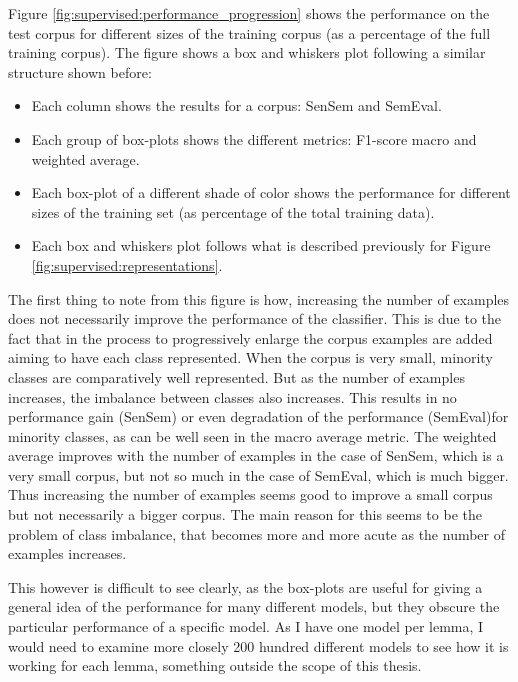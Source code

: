 Figure \ref{fig:supervised:performance_progression} shows the performance on
the test corpus for different sizes of the training corpus (as a percentage of
the full training corpus). The figure shows a box and whiskers plot following 
a similar structure shown before:

\begin{itemize}
  \item Each column shows the results for a corpus: SenSem and SemEval.
  \item Each group of box-plots shows the different metrics: F1-score macro
    and weighted average.
  \item Each box-plot of a different shade of color shows the performance for
    different sizes of the training set (as percentage of the total training
    data).
  \item Each box and whiskers plot follows what is described previously for
    Figure \ref{fig:supervised:representations}.
\end{itemize}

The first thing to note from this figure is how, increasing the number of
examples does not necessarily improve the performance of the classifier. This
is due to the fact that in the process to progressively enlarge the corpus
examples are added aiming to have each class represented. When the corpus is
very small, minority classes are comparatively well represented. But as the
number of examples increases, the imbalance between classes also increases.
This results in no performance gain (SenSem) or even degradation of the
performance (SemEval)for minority classes, as can be well seen in the macro
average metric. The weighted average improves with the number of examples in
the case of SenSem, which is a very small corpus, but not so much in the case
of SemEval, which is much bigger. Thus increasing the number of examples seems
good to improve a small corpus but not necessarily a bigger corpus. The main
reason for this seems to be the problem of class imbalance, that becomes more
and more acute as the number
of examples increases.

This however is difficult to see clearly, as the box-plots are useful for
giving a general idea of the performance for many different models, but they
obscure the particular performance of a specific model. As I have one model per
lemma, I would need to examine more closely 200 hundred different models to see
how it is working for each lemma, something outside the scope of this thesis.

